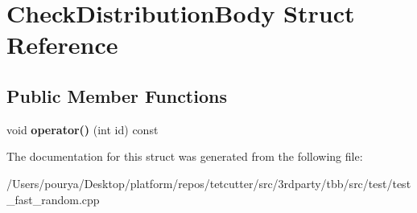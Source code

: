 \hypertarget{structCheckDistributionBody}{}\section{Check\+Distribution\+Body Struct Reference}
\label{structCheckDistributionBody}
\subsection*{Public Member Functions}
\begin{DoxyCompactItemize}
\item 
\hypertarget{structCheckDistributionBody_a7f8c1755c40f40d5f2db5cf7b0228391}{}void {\bfseries operator()} (int id) const \label{structCheckDistributionBody_a7f8c1755c40f40d5f2db5cf7b0228391}

\end{DoxyCompactItemize}


The documentation for this struct was generated from the following file\+:\begin{DoxyCompactItemize}
\item 
/\+Users/pourya/\+Desktop/platform/repos/tetcutter/src/3rdparty/tbb/src/test/test\+\_\+fast\+\_\+random.\+cpp\end{DoxyCompactItemize}
